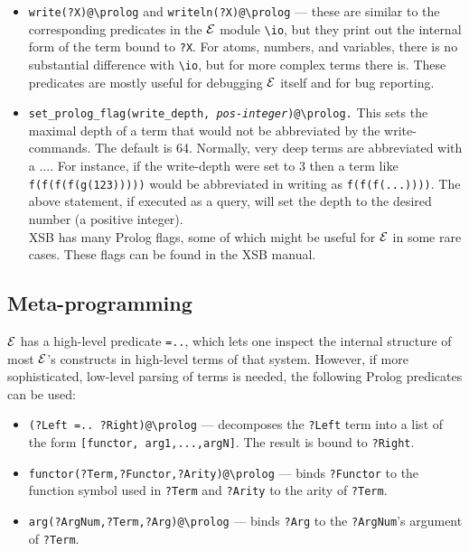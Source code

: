 \documentclass[11pt]{article}
\newcommand{\ERGO}{\mbox{\ensuremath{\cal{E}}\smaller{{\sc{RGO}}}}\xspace}
\newcommand{\FLSYSTEM}{\ERGO}
\newcommand{\bs}{\textbackslash}
\begin{document}
\begin{itemize}
\item  \texttt{write(?X)@\bs{}prolog} and \texttt{writeln(?X)@\bs{}prolog}
  --- these are similar to the corresponding predicates in the \FLSYSTEM module
  \texttt{\bs{}io}, but they print out the internal form of the term bound
  to \texttt{?X}. For atoms, numbers, and variables, there is no
  substantial difference with \texttt{\bs{}io}, but for more complex terms
  there is. These predicates are mostly useful for debugging \FLSYSTEM
  itself and for bug reporting.
\item \texttt{set\_prolog\_flag(write\_depth, {\it pos-integer\/})@\bs{}prolog.}
  This sets the maximal depth of a term that would not be abbreviated by
  the write-commands. The default is 64.
  Normally, very deep terms are abbreviated with a .... For instance, if
  the write-depth were set to 3 then a term like \texttt{f(f(f(f(g(123)))))}
  would be abbreviated in writing as \texttt{f(f(f(...))))}.  
  The above statement, if executed as a query, will set the depth to the
  desired number (a positive integer).
  \\
  XSB has many Prolog flags, some of which might be useful for \FLSYSTEM in
  some rare cases. These flags can be found in the XSB manual.
\end{itemize}

\subsection{Meta-programming}

\FLSYSTEM has a high-level predicate \texttt{=..}, which lets one inspect
the internal structure of most \FLSYSTEM's constructs in high-level terms of 
that system. However, if more sophisticated, low-level
parsing of terms is needed, the following Prolog predicates can be used:
\begin{itemize}
\item  \texttt{(?Left =.. ?Right)@\bs{}prolog} ---   decomposes the
  \texttt{?Left} term into a list of the form
  \texttt{[functor, arg1,...,argN]}. The result is bound to \texttt{?Right}.
\item \texttt{functor(?Term,?Functor,?Arity)@\bs{}prolog} --- binds
  \texttt{?Functor} to the function symbol used in \texttt{?Term} and
  \texttt{?Arity} to the arity of \texttt{?Term}.
\item \texttt{arg(?ArgNum,?Term,?Arg)@\bs{}prolog} --- binds \texttt{?Arg}
  to the \texttt{?ArgNum}'s argument of \texttt{?Term}.   
\end{itemize}
\end{document}
